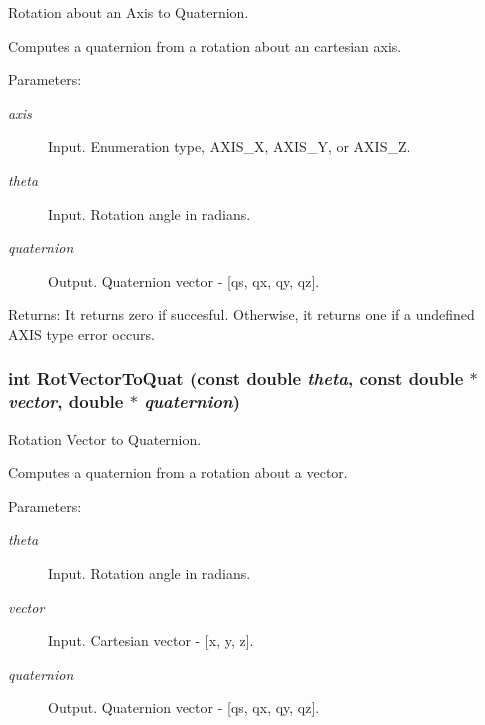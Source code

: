 Rotation about an Axis to Quaternion. 

Computes a quaternion from a rotation about an cartesian axis.

\begin{Desc}
\item[Parameters:]
\begin{description}
\item[{\em axis}]Input. Enumeration type, AXIS\_\-X, AXIS\_\-Y, or AXIS\_\-Z. \item[{\em theta}]Input. Rotation angle in radians. \item[{\em quaternion}]Output. Quaternion vector - \mbox{[}qs, qx, qy, qz\mbox{]}.\end{description}
\end{Desc}
\begin{Desc}
\item[Returns:]It returns zero if succesful. Otherwise, it returns one if a undefined AXIS type error occurs. \end{Desc}
\hypertarget{group__quaternion_g3ba8927f691411d3a01bba3d5cc52838}{
\subsubsection[RotVectorToQuat]{\setlength{\rightskip}{0pt plus 5cm}int RotVectorToQuat (const double {\em theta}, \/  const double $\ast$ {\em vector}, \/  double $\ast$ {\em quaternion})}}
\label{group__quaternion_g3ba8927f691411d3a01bba3d5cc52838}


Rotation Vector to Quaternion. 

Computes a quaternion from a rotation about a vector.

\begin{Desc}
\item[Parameters:]
\begin{description}
\item[{\em theta}]Input. Rotation angle in radians. \item[{\em vector}]Input. Cartesian vector - \mbox{[}x, y, z\mbox{]}. \item[{\em quaternion}]Output. Quaternion vector - \mbox{[}qs, qx, qy, qz\mbox{]}. \end{description}
\end{Desc}
